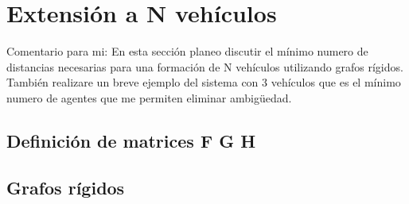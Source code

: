 \section{Extensión a N vehículos}
\label{section:Nvehi}

Comentario para mi: En esta sección planeo discutir el mínimo numero de distancias necesarias para una formación de N vehículos utilizando grafos rígidos. También realizare un breve ejemplo del sistema con 3 vehículos que es el mínimo numero de agentes que me permiten eliminar ambigüedad.
\subsection{Definición de matrices F G H} 
\subsection{Grafos rígidos}